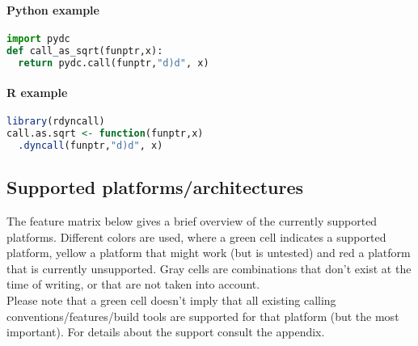 \paragraph{Python example}

\begin{lstlisting}[language=python,caption=Dyncall Python bindings example]
import pydc
def call_as_sqrt(funptr,x):
  return pydc.call(funptr,"d)d", x)
\end{lstlisting}


\paragraph{R example}

\begin{lstlisting}[language=R,caption=Dyncall R bindings example]
library(rdyncall)
call.as.sqrt <- function(funptr,x)
  .dyncall(funptr,"d)d", x)
\end{lstlisting}


\pagebreak

\subsection{Supported platforms/architectures}

The feature matrix below gives a brief overview of the currently supported
platforms. Different colors are used, where a green cell indicates a supported
platform, yellow a platform that might work (but is untested) and red a platform
that is currently unsupported. Gray cells are combinations that don't exist
at the time of writing, or that are not taken into account.\\
Please note that a green cell doesn't imply that all existing calling
conventions/features/build tools are supported for that platform (but the most important).
For details about the support consult the appendix.


